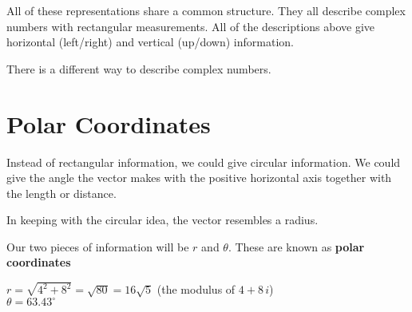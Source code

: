 \documentclass{ximera}
\begin{document}
All of these representations share a common structure.  They all describe complex numbers with rectangular measurements.  All of the descriptions above give horizontal (left/right) and vertical (up/down) information.


There is a different way to describe complex numbers.



\section{Polar Coordinates}

Instead of rectangular information, we could give circular information.  We could give the angle the vector makes with the positive horizontal axis together with the length or distance. 

In keeping with the circular idea, the vector resembles a radius.  

Our two pieces of information will be $r$ and $\theta$. These are known as \textbf{polar coordinates}

\begin{image}
\end{image}


$r = \sqrt{4^2 + 8^2} = \sqrt{80} = 16\sqrt{5}$ (the modulus of $4 + 8 \, i$) \\
$\theta = 63.43^{\circ}$ \\
\end{document}
